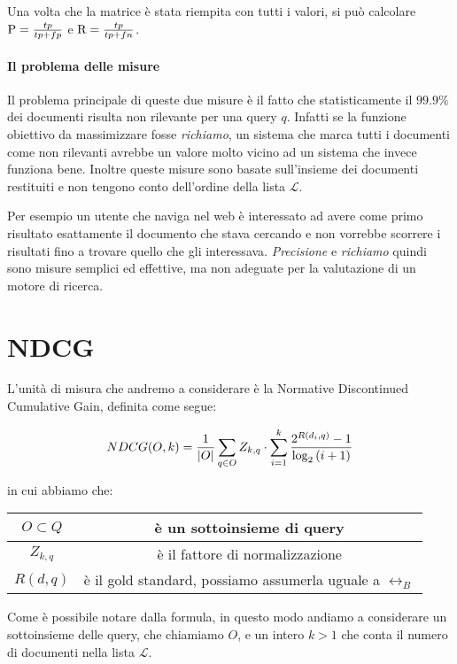 Una volta che la matrice è stata riempita con tutti i valori, si può calcolare $\text{P} = \frac{tp}{tp + fp}$ e $\text{R} = \frac{tp}{tp + fn}$.

\paragraph{Il problema delle misure}
Il problema principale di queste due misure è il fatto che statisticamente il $99.9\%$\cite{irbook} dei documenti
risulta non rilevante per una query $q$. 
Infatti se la funzione obiettivo da massimizzare fosse \textit{richiamo},
un sistema che marca tutti i documenti come non rilevanti avrebbe
un valore molto vicino ad un sistema che invece funziona bene. Inoltre
queste misure sono basate sull'insieme dei documenti restituiti e non tengono
conto dell'ordine della lista $\mathcal{L}$.

Per esempio un utente che naviga nel web è interessato
ad avere come primo risultato esattamente il documento che stava cercando
e non vorrebbe scorrere i risultati fino a trovare quello che gli interessava.
\textit{Precisione} e \textit{richiamo} quindi sono misure semplici ed effettive, ma non
adeguate per la valutazione di un motore di ricerca.

\section{NDCG}
L'unità di misura che andremo a considerare è la Normative Discontinued Cumulative Gain,
definita come segue:

$$\label{def:ndcg}
NDCG(O, k) = \frac{1}{\left|O\right|} \sum_{q \in O} Z_{k, q} \cdot \sum_{i=1}^{k} \frac{2^{R(d_i, q)} - 1}{\log_2{(i + 1)}} \\
$$

in cui abbiamo che:
\begin{table}[h!]
	\centering
	\begin{tabular}{|c|c|}
		\hline
		$ O \subset Q$ & è un sottoinsieme di query \\
		\hline
		$Z_{k,q}$ & è il fattore di normalizzazione \\
		\hline
		$R(d,q)$ & è il gold standard, possiamo assumerla uguale a $\rel_B$ \\
		\hline
	\end{tabular}
\end{table}

Come è possibile notare dalla formula, in questo modo andiamo a considerare un sottoinsieme delle query, che chiamiamo $O$,
e un intero $k>1$ che conta il numero di documenti nella lista $\mathcal{L}$.

